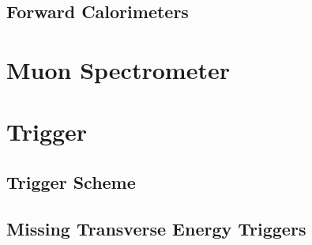 \subsection{Forward Calorimeters}


\section{Muon Spectrometer}


\section{Trigger}

\subsection{Trigger Scheme}

\subsection{Missing Transverse Energy Triggers}

